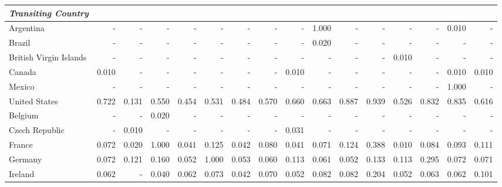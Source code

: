 \documentclass[10pt,twocolumn]{sig-alternate}
\begin{document}
\begin{table*}[t]
\centering
{}
\begin{adjustbox}{width=1\textwidth}
\small
\begin{tabular}{@{}ld{3.2}d{3.2}d{3.2}d{3.2}d{3.2}d{3.2}d{3.2}d{3.2}d{3.2}d{3.2}d{3.2}d{3.2}d{3.2}d{3.2}d{3.2}@{}}
\textit{Transiting Country} 
   &   &    &  &  &  &   &    &  &  &  &   &    &  &  & \\
\toprule
Argentina  & -  & -  & -  & -  & -  & -  & -  & -  & 1.000 & -  & -  & -  & -  & 0.010 & - \\
Brazil  & -  & -  & -  & -  & -  & -  & -  & -  & 0.020 & -  & -  & -  & -  & -  & - \\ \hline
British Virgin Islands  & -  & -  & -  & -  & -  & -  & -  & -  & -  & -  & -  & 0.010 & -  & -  & - \\
Canada  & 0.010 & -  & -  & -  & -  & -  & -  & 0.010 & -  & -  & -  & -  & -  & 0.010 & 0.010\\
Mexico  & -  & -  & -  & -  & -  & -  & -  & -  & -  & -  & -  & -  & -  & 1.000 & - \\
United States  & 0.722 & 0.131 & 0.550 & 0.454 & 0.531 & 0.484 & 0.570 & 0.660 & 0.663 & 0.887 & 0.939 & 0.526 & 0.832 & 0.835 & 0.616\\ \hline
Belgium  & -  & -  & 0.020 & -  & -  & -  & -  & -  & -  & -  & -  & -  & -  & -  & - \\
Czech Republic  & -  & 0.010 & -  & -  & -  & -  & -  & 0.031 & -  & -  & -  & -  & -  & -  & - \\
France  & 0.072 & 0.020 & 1.000 & 0.041 & 0.125 & 0.042 & 0.080 & 0.041 & 0.071 & 0.124 & 0.388 & 0.010 & 0.084 & 0.093 & 0.111\\
Germany  & 0.072 & 0.121 & 0.160 & 0.052 & 1.000 & 0.053 & 0.060 & 0.113 & 0.061 & 0.052 & 0.133 & 0.113 & 0.295 & 0.072 & 0.071\\
Ireland  & 0.062 & -  & 0.040 & 0.062 & 0.073 & 0.042 & 0.070 & 0.052 & 0.082 & 0.082 & 0.204 & 0.052 & 0.063 & 0.062 & 0.101\\

\end{tabular}
\end{adjustbox}
\end{table*}
\end{document}
